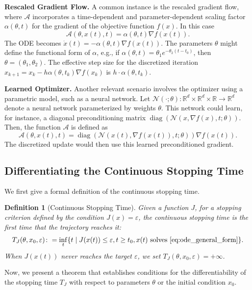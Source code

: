 \documentclass{article}
\newcommand{\Acal}{\mathcal{A}}
\newcommand{\R}{\mathbb{R}}
\newtheorem{definition}{Definition}
\begin{document}
\textbf{Rescaled Gradient Flow.}
A common instance is the rescaled gradient flow, where $\Acal$ incorporates a time-dependent and parameter-dependent scaling factor $\alpha(\theta, t)$ for the gradient of the objective function $f(x)$. In this case
\begin{equation}
    \Acal(\theta, x(t), t) = \alpha(\theta, t) \nabla f(x(t)).
\end{equation}
The ODE becomes $\dot{x}(t) = -\alpha(\theta, t) \nabla f(x(t))$. The parameters $\theta$ might define the functional form of $\alpha$, e.g., if $\alpha(\theta, t) = \theta_1 e^{-\theta_2 (t-t_0)}$, then $\theta=(\theta_1, \theta_2)$. The effective step size for the discretized iteration $x_{k+1} = x_k - h \alpha(\theta, t_k) \nabla f(x_k)$ is $h \cdot \alpha(\theta, t_k)$.

\textbf{Learned Optimizer.}
Another relevant scenario involves the optimizer using a parametric model, such as a neural network. Let $\mathcal{N}(\cdot; \theta)\colon \R^d\times\R^d\times\R\to\R^d$ denote a neural network parameterized by weights $\theta$. This network could learn, for instance, a diagonal preconditioning matrix $\operatorname{diag}(\mathcal{N}(x, \nabla f(x), t; \theta))$. Then, the function $\Acal$ is defined as
\begin{equation}
\label{eq:preconditioner}
    \Acal(\theta, x(t), t) = \operatorname{diag}(\mathcal{N}(x(t), \nabla f(x(t)), t; \theta)) \nabla f(x(t)).
\end{equation}
The discretized update would then use this learned preconditioned gradient.

\subsection{Differentiating the Continuous Stopping Time}
We first give a formal definition of the continuous stopping time.
\begin{definition}[Continuous Stopping Time]
Given a function $J$, for a stopping criterion defined by the condition $J(x)=\varepsilon$, the continuous stopping time is the first time that the trajectory reaches it:
\begin{equation}
    T_{J}(\theta,x_0,\varepsilon)\colon=\inf_{t}\{t\mid J(x(t))\leq \varepsilon ,  t\geq t_0, x(t) \text{ solves \eqref{eq:ode_general_form}}\}.
\end{equation}
When $J(x(t))$ never reaches the target $\varepsilon$, we set $T_{J}(\theta,x_0,\varepsilon)=+\infty$.
\end{definition}
Now, we present a theorem that establishes conditions for the differentiability of the stopping time $T_J$ with respect to parameters $\theta$ or the initial condition $x_0$.
\end{document}
